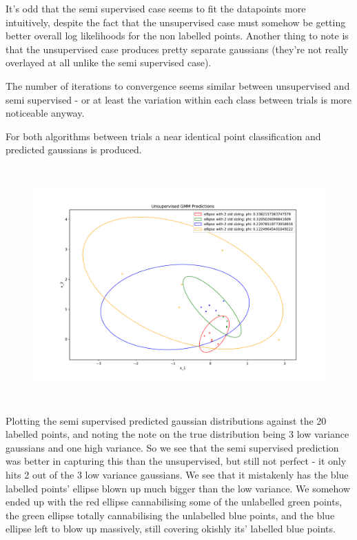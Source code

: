 \begin{answer}
It's odd that the semi supervised case seems to fit the datapoints more intuitively, despite the fact that the unsupervised case must somehow be getting better overall log likelihoods for the non labelled points. Another thing to note is that the unsupervised case produces pretty separate gaussians (they're not really overlayed at all unlike the semi supervised case).

The number of iterations to convergence seems similar between unsupervised and semi supervised - or at least the variation within each class between trials is more noticeable anyway.

For both algorithms between trials a near identical point classification and predicted gaussians is produced.

\begin{figure}[H]
\includegraphics[width=15cm,height=9cm,keepaspectratio]{../src/semi_supervised_em/pred_labelled.pdf}
\end{figure}

Plotting the semi supervised predicted gaussian distributions against the 20 labelled points, and noting the note on the true distribution being 3 low variance gaussians and one high variance. So we see that the semi supervised prediction was better in capturing this than the unsupervised, but still not perfect - it only hits 2 out of the 3 low variance gaussians. We see that it mistakenly has the blue labelled points' ellipse blown up much bigger than the low variance. We somehow ended up with the red ellipse cannabilising some of the unlabelled green points, the green ellipse totally cannabilising the unlabelled blue points, and the blue ellipse left to blow up massively, still covering okishly its' labelled blue points.


\end{answer}
